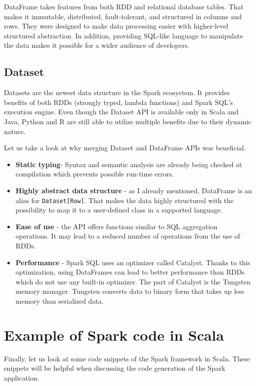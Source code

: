 DataFrame takes features from both RDD and relational database tables. That makes it immutable, distributed, fault-tolerant, and structured in columns and rows. 
They were designed to make data processing easier with higher-level structured abstraction. In addition, providing SQL-like language to manipulate the data makes it possible for a wider audience of developers. 

\subsection*{Dataset}

Datasets are the newest data structure in the Spark ecosystem. 
It provides benefits of both RDDs (strongly typed, lambda functions) and Spark SQL's execution engine. Even though the Dataset API is available only in Scala and Java, Python and R are still able to utilize multiple benefits due to their dynamic nature.


Let us take a look at why merging Dataset and DataFrame APIs was beneficial.

\begin{itemize}
\item \textbf{Static typing}- Syntax and semantic analysis are already being checked at compilation which prevents possible run-time errors.
\item \textbf{Highly abstract data structure} - as I already mentioned, DataFrame is an alias for \texttt{Dataset[Row]}. That makes the data highly structured with the possibility to map it to a user-defined class in a supported language.
\item \textbf{Ease of use} - the API offers functions similar to SQL aggregation operations. It may lead to a reduced number of operations from the use of RDDs.
\item \textbf{Performance} - Spark SQL uses an optimizer called Catalyst. Thanks to this optimization, using DataFrames can lead to better performance than RDDs which do not use any built-in optimizer. The part of Catalyst is the Tungsten memory manager. Tungsten converts data to binary form that takes up less memory than serialized data.
\end{itemize}


\section{Example of Spark code in Scala}

Finally, let us look at some code snippets of the Spark framework in Scala. These snippets will be helpful when discussing the code generation of the Spark application.


